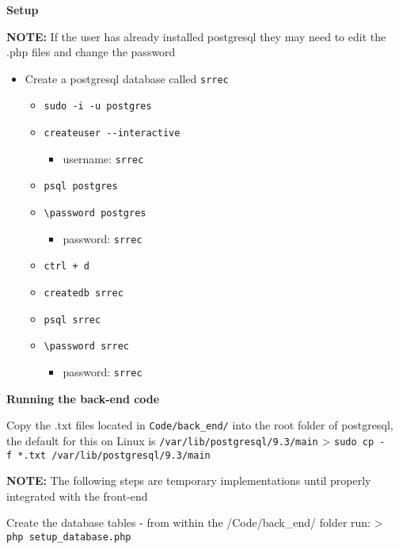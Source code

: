 \documentclass[]{article}
\providecommand{\tightlist}{%
  \setlength{\itemsep}{0pt}\setlength{\parskip}{0pt}}
\begin{document}
\textbf{Setup}

\textbf{NOTE:} If the user has already installed postgresql they may
need to edit the .php files and change the password

\begin{itemize}
\tightlist
\item
  Create a postgresql database called \texttt{srrec}

  \begin{itemize}
  \tightlist
  \item
    \texttt{sudo\ -i\ -u\ postgres}
  \item
    \texttt{createuser\ -\/-interactive}

    \begin{itemize}
    \tightlist
    \item
      username: \texttt{srrec}
    \end{itemize}
  \item
    \texttt{psql\ postgres}
  \item
    \texttt{\textbackslash{}password\ postgres}

    \begin{itemize}
    \tightlist
    \item
      password: \texttt{srrec}
    \end{itemize}
  \item
    \texttt{ctrl\ +\ d}
  \item
    \texttt{createdb\ srrec}
  \item
    \texttt{psql\ srrec}
  \item
    \texttt{\textbackslash{}password\ srrec}

    \begin{itemize}
    \tightlist
    \item
      password: \texttt{srrec}
    \end{itemize}
  \end{itemize}
\end{itemize}

\textbf{Running the back-end code}

Copy the .txt files located in \texttt{Code/back\_end/} into the root
folder of postgresql, the default for this on Linux is
\texttt{/var/lib/postgresql/9.3/main} \textgreater{}
\texttt{sudo\ cp\ -f\ *.txt\ /var/lib/postgresql/9.3/main}

\textbf{NOTE:} The following steps are temporary implementations until
properly integrated with the front-end

Create the database tables - from within the /Code/back\_end/ folder
run: \textgreater{} \texttt{php\ setup\_database.php}
\end{document}
